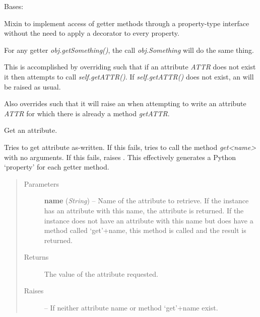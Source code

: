 \documentclass[letterpaper,10pt,english]{sphinxmanual}
\begin{document}

\begin{fulllineitems}
\label{eqtools:eqtools.core.PropertyAccessMixin}
Bases: 

Mixin to implement access of getter methods through a property-type
interface without the need to apply a decorator to every property.

For any getter \emph{obj.getSomething()}, the call \emph{obj.Something} will do the
same thing.

This is accomplished by overriding {\hyperref[eqtools:eqtools.core.PropertyAccessMixin.__getattribute__]{}} such that if
an attribute \emph{ATTR} does not exist it then attempts to call \emph{self.getATTR()}.
If \emph{self.getATTR()} does not exist, an  will be
raised as usual.

Also overrides {\hyperref[eqtools:eqtools.core.PropertyAccessMixin.__setattr__]{}} such that it will raise an
 when attempting to write an attribute \emph{ATTR} for
which there is already a method \emph{getATTR}.

\begin{fulllineitems}
\label{eqtools:eqtools.core.PropertyAccessMixin.__getattribute__}
Get an attribute.

Tries to get attribute as-written. If this fails, tries to call the
method \emph{get\textless{}name\textgreater{}} with no arguments. If this fails, raises
. This effectively generates a Python
`property' for each getter method.
\begin{quote}\begin{description}
\item[{Parameters}] \leavevmode
\textbf{name} (\emph{String}) --
Name of the attribute to retrieve. If the instance
has an attribute with this name, the attribute is returned. If
the instance does not have an attribute with this name but does
have a method called `get'+name, this method is called and the
result is returned.

\item[{Returns}] \leavevmode
The value of the attribute requested.

\item[{Raises}] \leavevmode
{} -- 
If neither attribute name or method `get'+name exist.


\end{description}
\end{quote}
\end{fulllineitems}
\end{fulllineitems}
\end{document}
